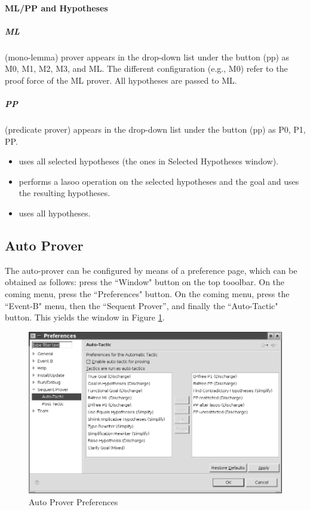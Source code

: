 \paragraph{ML/PP and Hypotheses}

\subparagraph{ML}

 (mono-lemma) prover appears in the drop-down list under the button (pp) as M0, M1, M2, M3, and ML. The different configuration (e.g., M0) refer to the proof force of the ML prover. All hypotheses are passed to ML.

\subparagraph{PP}

 (predicate prover) appears in the drop-down list under the button (pp) as P0, P1, PP.

\begin{itemize}
	\item {} uses all selected hypotheses (the ones in Selected Hypotheses window).
	\item {} performs a lasoo operation on the selected hypotheses and the goal and uses the resulting hypotheses.
	\item {} uses all hypotheses. 
\end{itemize}

\subsection{Auto Prover}
\label{auto_prover}

The auto-prover can be configured by means of a preference page, which can be obtained as follows: press the ``Window" button on the top tooolbar. On the coming menu, press the ``Preferences" button. On the coming menu, press the ``Event-B" menu, then the ``Sequent Prover'', and finally the ``Auto-Tactic" button. This yields the window in Figure \ref{fig_ref_10_auto_prover_pref}.

\begin{figure}[!ht]
\begin{center}
	\includegraphics{img/reference/ref_10_auto_prover_pref.png}
	\caption{Auto Prover Preferences}
	\label{fig_ref_10_auto_prover_pref}
\end{center}
\end{figure}

